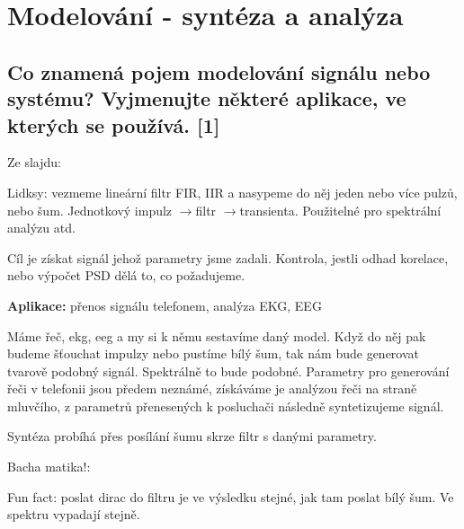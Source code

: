 \documentclass[a4paper,12pt]{article}   %
\newcommand{\rrarr}{$\rightarrow$}
\begin{document}
\tableofcontents
\newpage
\section{Modelování - syntéza a analýza}
\subsection{Co znamená pojem modelování signálu nebo systému? Vyjmenujte některé aplikace, ve kterých se používá. [1]}
Ze slajdu: 


Lidksy: vezmeme lineární filtr FIR, IIR a nasypeme do něj jeden nebo více pulzů, nebo šum. Jednotkový impulz \rrarr filtr \rrarr transienta. Použitelné pro spektrální analýzu atd. 

Cíl je získat signál jehož parametry jsme zadali. Kontrola, jestli odhad korelace, nebo výpočet PSD dělá to, co požadujeme.

\textbf{Aplikace:} přenos signálu telefonem, analýza EKG, EEG

Máme řeč, ekg, eeg a my si k němu sestavíme daný model. Když do něj pak budeme šťouchat impulzy nebo pustíme bílý šum, tak nám bude generovat tvarově podobný signál. Spektrálně to bude podobné. Parametry pro generování řeči v telefonii jsou předem neznámé, získáváme je analýzou řeči na straně mluvčího, z parametrů přenesených k posluchači následně syntetizujeme signál. 

Syntéza probíhá přes posílání šumu skrze filtr s danými parametry. 

Bacha matika!:

Fun fact: poslat dirac do filtru je ve výsledku stejné, jak tam poslat bílý šum. Ve spektru vypadají stejně.
\end{document}
